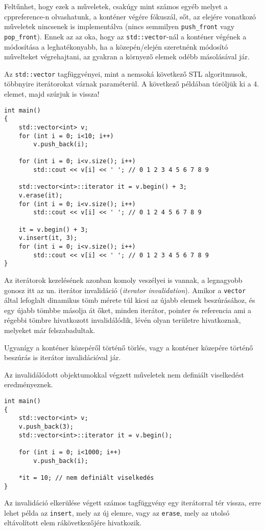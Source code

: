 \documentclass[a4paper,11.5pt,table]{article}
\begin{document}
	Feltűnhet, hogy ezek a műveletek, csakúgy mint számos egyéb melyet a cppreference-n olvashatunk, a konténer végére fókuszál, sőt, az elejére vonatkozó műveletek nincsenek is implementálva (nincs semmilyen \texttt{push\_front} vagy \texttt{pop\_front}). Ennek az az oka, hogy az \texttt{std::vector}-nál a konténer végének a módosítása a leghatékonyabb, ha a közepén/elején szeretnénk módosító művelteket végrehajtani, az gyakran a környező elemek odébb másolásával jár.

	\medskip
	Az \texttt{std::vector} tagfüggvényei, mint a nemsoká következő STL algoritmusok, többnyire iterátorokat várnak paraméterül. A következő példában töröljük ki a 4. elemet, majd szúrjuk is vissza!
	\begin{lstlisting}
int main()
{
	std::vector<int> v;
	for (int i = 0; i<10; i++)
		v.push_back(i);
		
	for (int i = 0; i<v.size(); i++)
		std::cout << v[i] << ' '; // 0 1 2 3 4 5 6 7 8 9
		
	std::vector<int>::iterator it = v.begin() + 3;
	v.erase(it);
	for (int i = 0; i<v.size(); i++)
		std::cout << v[i] << ' '; // 0 1 2 4 5 6 7 8 9
	
	it = v.begin() + 3;
	v.insert(it, 3);
	for (int i = 0; i<v.size(); i++)
		std::cout << v[i] << ' '; // 0 1 2 3 4 5 6 7 8 9
}
	\end{lstlisting}
	Az iterátorok kezelésének azonban komoly veszélyei is vannak, a legnagyobb gonosz itt az un. iterátor invalidáció (\textit{iterator invalidation}). Amikor a \texttt{vector} által lefoglalt dinamikus tömb mérete túl kicsi az újabb elemek beszúrásához, és egy újabb tömbbe másolja át őket, minden iterátor, pointer és referencia ami a régebbi tömbre hivatkozott invalidálódik, lévén olyan területre hivatkoznak, melyeket már felszabadultak. 
	\smallskip
	
	Ugyanígy a konténer közepéről történő törlés, vagy a konténer közepére történő beszúrás is iterátor invalidációval jár.
	\smallskip
	
	Az invalidálódott objektumokkal végzett műveletek nem definiált viselkedést eredményeznek.
	\begin{lstlisting}
int main()
{
	std::vector<int> v;
	v.push_back(3);
	std::vector<int>::iterator it = v.begin();
	
	for (int i = 0; i<1000; i++)
		v.push_back(i);
		
	*it = 10; // nem definiált viselkedés
}
	\end{lstlisting}
	Az invalidáció elkerülése végett számos tagfüggvény egy iterátorral tér vissza, erre lehet példa az \texttt{insert}, mely az új elemre, vagy az \texttt{erase}, mely az utolsó eltávolított elem rákövetkezőjére hivatkozik.
	
\end{document}
